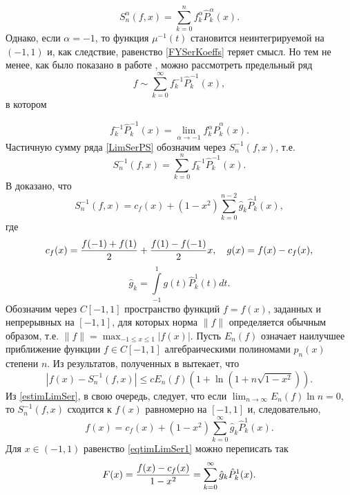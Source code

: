 \begin{equation}\label{intreq.1.2.4.1.4}
S_n^\alpha(f,x)= \sum _{k=0}^n f_k^\alpha \hat P_k^\alpha(x).
\end{equation}
Однако, если $\alpha=-1$, то  функция $\mu^{-1}(t)$ становится неинтегрируемой на $(-1,1)$ и, как следствие, равенство \eqref{FYSerKoeffs} теряет смысл. Но тем не менее, как было показано в работе \cite{shii1}, можно рассмотреть предельный ряд
\begin{equation}\label{LimSerPS}
f\sim \sum_{k=0}^\infty f_k^{-1}\hat P_k^{-1}(x),
\end{equation}
 в котором

$$
f_k^{-1}\hat P_k^{-1}(x)=\lim_{\alpha\to-1}f_k^{\alpha}\hat P_k^{\alpha}(x).
$$
Частичную сумму ряда \eqref{LimSerPS} обозначим через $S_n^{-1}(f,x)$, т.е.
$$
S_n^{-1}(f,x)= \sum _{k=0}^n f_k^{-1} \hat P_k^{-1}(x).
$$
В \cite{shii1} доказано, что
\begin{equation}\label{eq.1.2.4.1.6}
S_n^{-1}(f,x)=c_f(x)+(1-x^2)\sum_{k=0}^{n-2}\hat g_k\hat P_k^1(x),
\end{equation}
где
\begin{equation}\label{eq.1.2.4.1.7}
c_f(x)={f(-1)+f(1)\over 2}+{f(1)-f(-1)\over
2}x,\quad
g(x)=f(x)-c_f(x),
\end{equation}
\begin{equation}\label{eq.1.2.4.1.8}
\hat g_k=\int\limits_{-1}^1g(t)\hat P_k^{1}(t)dt.
\end{equation}
Обозначим через $C[-1,1]$ пространство функций $f=f(x)$, заданных и непрерывных на $[-1,1]$, для которых норма  $\|f\|$  определяется обычным образом, т.е. $\|f\|=\max_{-1\le x\le1}|f(x)|$.
Пусть $E_n(f)$ означает наилучшее приближение функции $f\in C[-1,1] $
алгебраическими полиномами $p_n(x)$ степени $n$. Из результатов, полученных в \cite{shii1} вытекает, что
  \begin{equation}\label{estimLimSer}
 |f(x)-S_n^{-1}(f,x)|\le cE_n(f)(1+\ln(1+n\sqrt{1-x^2})).
 \end{equation}
Из \eqref{estimLimSer}, в свою очередь, следует, что если $\lim_{n\to\infty}E_n(f)\ln n=0$, то $S_n^{-1}(f,x)$ сходится к  $f(x)$ равномерно на $[-1,1]$ и, следовательно,
\begin{equation}\label{eqtimLimSer1}%
f(x)=c_f(x)+(1-x^2)\sum_{k=0}^\infty\hat g_k\hat P_k^1(x).
\end{equation}
Для $x\in (-1,1)$ равенство \eqref{eqtimLimSer1} можно переписать так
\begin{equation}\label{eqtimLimSer2}%
F(x)={f(x)-c_f(x)\over 1-x^2}=\sum_{k=0}^\infty\hat g_k\hat P_k^1(x).
\end{equation}
